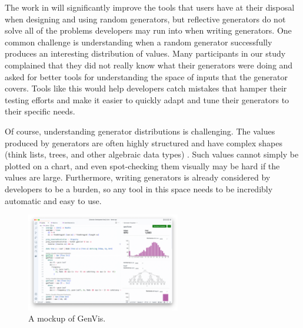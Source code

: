 
\newcommand{\genvis}{GenVis}

The work in  will significantly improve the tools that
users have at their disposal when designing and using random generators, but
reflective generators do not solve all of the problems developers may run into
when writing generators. One common challenge is understanding when a random
generator successfully produces an interesting distribution of values. Many
participants in our study complained that they did not really know what their
generators were doing and asked for better tools for understanding the space of
inputs that the generator covers. Tools like this would help developers catch
mistakes that hamper their testing efforts and make it easier to quickly adapt
and tune their generators to their specific needs.

Of course, understanding generator distributions is challenging.  The values
produced by generators are often highly structured and have complex shapes
(think lists, trees, and other algebraic data types) .  Such values cannot simply
be plotted on a chart, and even spot-checking them visually may be hard if the
values are large.  Furthermore, writing generators is already considered by
developers to be a burden, so any tool in this space needs to be incredibly
automatic and easy to use.

\begin{figure}
  \centering
  \includegraphics[width=0.6\textwidth]{assets/gen-vis.png}
  \caption{A mockup of \genvis. }\label{fig:gen-vis}
\end{figure}

